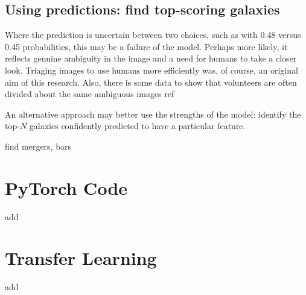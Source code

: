 \documentclass[preprint]{aastex631}
\newcommand{\todo}{\color{red}{TODO}\color{black}\hspace{2mm}}
\begin{document}
\subsection{Using predictions: find top-scoring galaxies}

Where the prediction is uncertain between two choices, such as with 0.48 versus 0.45 probabilities, this may be a failure of the model. Perhaps more likely, it reflects genuine ambiguity in the image and a need for humans to take a closer look. Triaging images to use humans more efficiently was, of course, an original aim of this research. Also, there is some data to show that volunteers are often divided about the same ambiguous images \todo ref

An alternative approach may better use the strengths of the model: identify the top-$N$ galaxies confidently predicted to have a particular feature.

\todo find mergers, bars

\section{PyTorch Code}

\todo add 

\section{Transfer Learning}

\todo add 



{}

\end{document}
